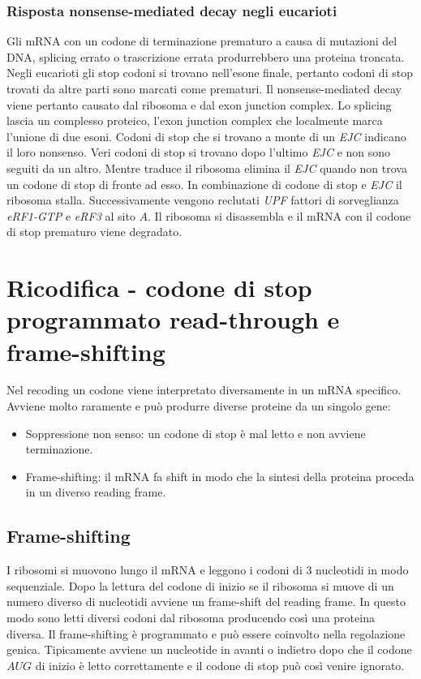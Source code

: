 \subsubsection{Risposta nonsense-mediated decay negli eucarioti}
Gli mRNA con un codone di terminazione prematuro a causa di mutazioni del DNA, splicing errato o trascrizione errata produrrebbero una proteina troncata. Negli eucarioti gli 
stop codoni si trovano nell'esone finale, pertanto codoni di stop trovati da altre parti sono marcati come prematuri. Il nonsense-mediated decay viene pertanto causato dal ribosoma
e dal exon junction complex. Lo splicing lascia un complesso proteico, l'exon junction complex che localmente marca l'unione di due esoni. Codoni di stop che si trovano a monte di un 
\emph{EJC} indicano il loro nonsenso. Veri codoni di stop si trovano dopo l'ultimo \emph{EJC} e non sono seguiti da un altro. Mentre traduce il ribosoma elimina il \emph{EJC} quando non 
trova un codone di stop di fronte ad esso. In combinazione di codone di stop e \emph{EJC} il ribosoma stalla. Successivamente vengono reclutati \emph{UPF} fattori di sorveglianza 
\emph{eRF1-GTP} e \emph{eRF3} al sito $A$. Il ribosoma si disassembla e il mRNA con il codone di stop prematuro viene degradato. 
\section{Ricodifica - codone di stop programmato read-through e frame-shifting}
Nel recoding un codone viene interpretato diversamente in un mRNA specifico. Avviene molto raramente e pu\`o produrre diverse proteine da un singolo gene:
\begin{itemize}
	\item Soppressione non senso: un codone di stop \`e mal letto e non avviene terminazione.
	\item Frame-shifting: il mRNA fa shift in modo che la sintesi della proteina proceda in un diverso reading frame. 
\end{itemize}
\subsection{Frame-shifting}
I ribosomi si muovono lungo il mRNA e leggono i codoni di $3$ nucleotidi in modo sequenziale. Dopo la lettura del codone di inizio se il ribosoma si muove di un numero diverso di 
nucleotidi avviene un frame-shift del reading frame. In questo modo sono letti diversi codoni dal ribosoma producendo cos\`i una proteina diversa. Il frame-shifting \`e programmato
e pu\`o essere coinvolto nella regolazione genica. Tipicamente avviene un nucleotide in avanti o indietro dopo che il codone $AUG$ di inizio \`e letto correttamente e il codone di 
stop pu\`o cos\`i venire ignorato. 
